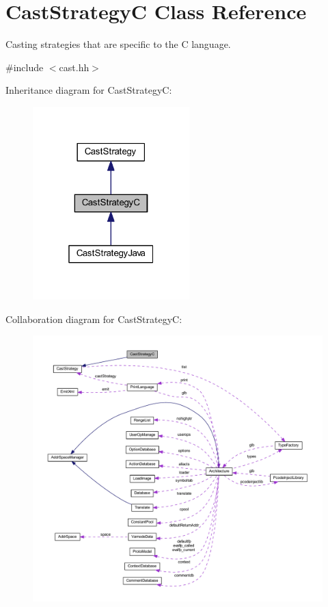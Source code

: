 \hypertarget{class_cast_strategy_c}{}\section{Cast\+StrategyC Class Reference}
\label{class_cast_strategy_c}


Casting strategies that are specific to the C language.  




{\ttfamily \#include $<$cast.\+hh$>$}



Inheritance diagram for Cast\+StrategyC\+:
\nopagebreak
\begin{figure}[H]
\begin{center}
\leavevmode
\includegraphics[width=172pt]{class_cast_strategy_c__inherit__graph}
\end{center}
\end{figure}


Collaboration diagram for Cast\+StrategyC\+:
\nopagebreak
\begin{figure}[H]
\begin{center}
\leavevmode
\includegraphics[width=350pt]{class_cast_strategy_c__coll__graph}
\end{center}
\end{figure}
